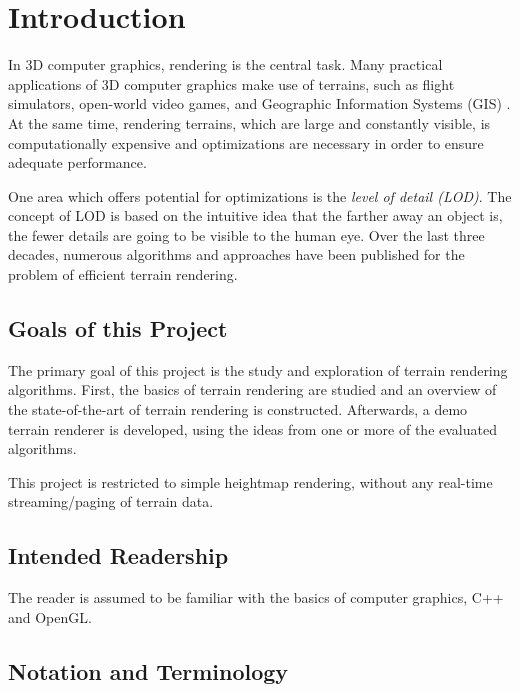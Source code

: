 \chapter{Introduction}
In 3D computer graphics, rendering is the central task.
Many practical applications of 3D computer graphics make use of terrains, 
such as flight simulators, open-world video games, and Geographic Information Systems (GIS) \cite[p.~185]{lodfor3dgraphics}.
At the same time, rendering terrains, which are large and constantly visible, is computationally expensive 
and optimizations are necessary in order to ensure adequate performance.

One area which offers potential for optimizations is the \textit{level of detail (LOD)}.
The concept of LOD is based on the intuitive idea that the farther away an object is, the fewer details are going to be visible to the human eye.
Over the last three decades, numerous algorithms and approaches have been published 
for the problem of efficient terrain rendering.

\section{Goals of this Project}
The primary goal of this project is the study and exploration
of terrain rendering algorithms.
First, the basics of terrain rendering are studied and 
an overview of the state-of-the-art of terrain rendering is 
constructed. Afterwards, a demo terrain renderer is developed,
using the ideas from one or more of the evaluated algorithms.

This project is restricted to simple heightmap rendering, without any real-time 
streaming/paging of terrain data.

\section{Intended Readership}
The reader is assumed to be familiar with the basics of computer graphics, C++ and OpenGL.

\section{Notation and Terminology}
